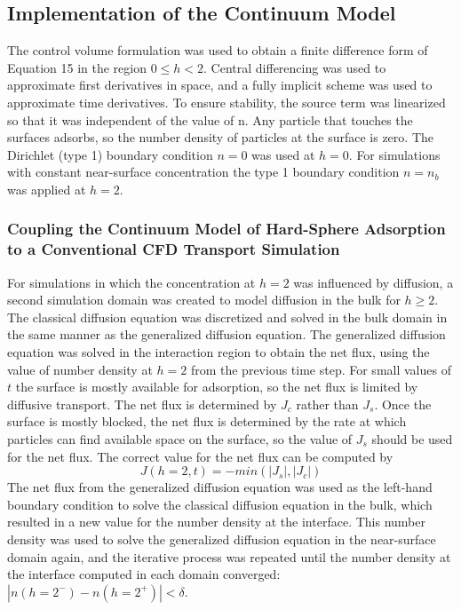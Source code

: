 \subsection{Implementation of the Continuum Model}

The control volume formulation \cite{Patankar1980} was used to obtain
a finite difference form of Equation 15 in the region $0\leq h<2$.
Central differencing was used to approximate first derivatives in
space, and a fully implicit scheme was used to approximate time derivatives.
To ensure stability, the source term was linearized so that it was
independent of the value of n. Any particle that touches the surfaces
adsorbs, so the number density of particles at the surface is zero.
The Dirichlet (type 1) boundary condition $n=0$ was used at $h=0$.
For simulations with constant near-surface concentration the type
1 boundary condition $n=n_{b}$ was applied at $h=2$. 


\subsubsection{Coupling the Continuum Model of Hard-Sphere Adsorption to a Conventional
CFD Transport Simulation}

For simulations in which the concentration at $h=2$ was influenced
by diffusion, a second simulation domain was created to model diffusion
in the bulk for $h\geq2$. The classical diffusion equation was discretized
and solved in the bulk domain in the same manner as the generalized
diffusion equation. The generalized diffusion equation was solved
in the interaction region to obtain the net flux, using the value
of number density at $h=2$ from the previous time step. For small
values of $t$ the surface is mostly available for adsorption, so
the net flux is limited by diffusive transport. The net flux is determined
by $J_{c}$ rather than $J_{s}$. Once the surface is mostly blocked,
the net flux is determined by the rate at which particles can find
available space on the surface, so the value of $J_{s}$ should be
used for the net flux. The correct value for the net flux can be computed
by\begin{equation}
J\left(h=2,t\right)=-min\left(\left|J_{s}\right|,\left|J_{c}\right|\right)\label{eq:Net flux}\end{equation}
 The net flux from the generalized diffusion equation was used as
the left-hand boundary condition to solve the classical diffusion
equation in the bulk, which resulted in a new value for the number
density at the interface. This number density was used to solve the
generalized diffusion equation in the near-surface domain again, and
the iterative process was repeated until the number density at the
interface computed in each domain converged:$\left|n\left(h=2^{-}\right)-n\left(h=2^{+}\right)\right|<\delta$.


